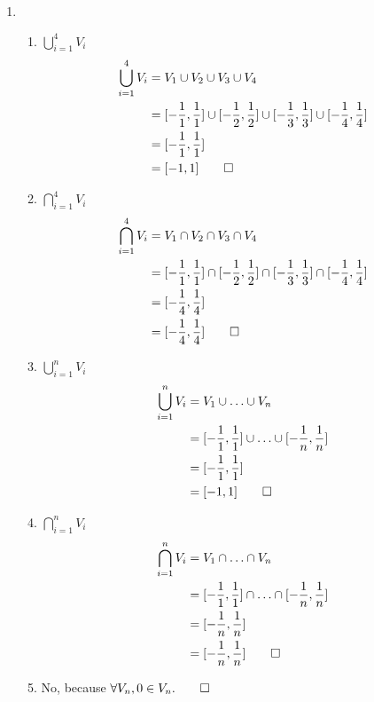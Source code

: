 \documentclass[12pt, a4paper]{article}
\begin{document}
\begin{enumerate}[Q\arabic*.]
  \pagebreak
  \item 
    \begin{enumerate}[(\alph*)]
      \item $\displaystyle \bigcup^4_{i=1}V_i$
        \begin{align*}
          \bigcup^4_{i=1}V_i &= V_1 \cup V_2 \cup V_3 \cup V_4\\
                             &= [-\frac{1}{1}, \frac{1}{1}] \cup [-\frac{1}{2}, \frac{1}{2}] \cup [-\frac{1}{3}, \frac{1}{3}] \cup [-\frac{1}{4}, \frac{1}{4}]\\
                             &= [-\frac{1}{1}, \frac{1}{1}]\\
                             &= [-1, 1] \qed
        \end{align*}
      \item $\displaystyle \bigcap^4_{i=1}V_i$
        \begin{align*}
          \bigcap^4_{i=1}V_i &= V_1 \cap V_2 \cap V_3 \cap V_4\\
                             &= [-\frac{1}{1}, \frac{1}{1}] \cap [-\frac{1}{2}, \frac{1}{2}] \cap [-\frac{1}{3}, \frac{1}{3}] \cap [-\frac{1}{4}, \frac{1}{4}]\\
                             &= [-\frac{1}{4}, \frac{1}{4}]\\
                             &= [-\frac{1}{4}, \frac{1}{4}] \qed
        \end{align*}
      \item $\displaystyle \bigcup^n_{i=1}V_i$
        \begin{align*}
          \bigcup^n_{i=1}V_i &= V_1 \cup \ldots \cup V_n\\
                             &= [-\frac{1}{1}, \frac{1}{1}] \cup \ldots \cup [-\frac{1}{n}, \frac{1}{n}]\\
                             &= [-\frac{1}{1}, \frac{1}{1}]\\
                             &= [-1, 1]\qed
        \end{align*}
      
      \item $\displaystyle \bigcap^n_{i=1}V_i$
        \begin{align*}
          \bigcap^n_{i=1}V_i &= V_1 \cap \ldots \cap V_n\\
                             &= [-\frac{1}{1}, \frac{1}{1}] \cap \ldots \cap [-\frac{1}{n}, \frac{1}{n}]\\
                             &= [-\frac{1}{n}, \frac{1}{n}]\\
                             &= [-\frac{1}{n}, \frac{1}{n}]\qed
        \end{align*}

      \item No, because $\forall V_n, 0 \in V_n.\qed$
    \end{enumerate}


\end{enumerate}
\end{document}
